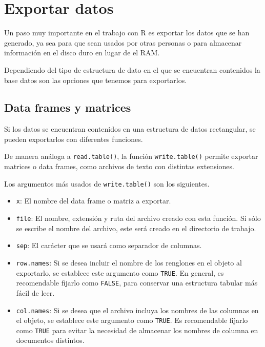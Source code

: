 \documentclass[
]{book}
\providecommand{\tightlist}{%
  \setlength{\itemsep}{0pt}\setlength{\parskip}{0pt}}
\begin{document}
\hypertarget{exportar-datos}{%
\section{Exportar datos}\label{exportar-datos}}

Un paso muy importante en el trabajo con R es exportar los datos que se han generado, ya sea para que sean usados por otras personas o para almacenar información en el disco duro en lugar de el RAM.

Dependiendo del tipo de estructura de dato en el que se encuentran contenidos la base datos son las opciones que tenemos para exportarlos.

\hypertarget{data-frames-y-matrices}{%
\subsection{Data frames y matrices}\label{data-frames-y-matrices}}

Si los datos se encuentran contenidos en una estructura de datos rectangular, se pueden exportarlos con diferentes funciones.

De manera análoga a \texttt{read.table()}, la función \texttt{write.table()} permite exportar matrices o data frames, como archivos de texto con distintas extensiones.

Los argumentos más usados de \texttt{write.table()} son los siguientes.

\begin{itemize}
\tightlist
\item
  \texttt{x}: El nombre del data frame o matriz a exportar.\\
\item
  \texttt{file}: El nombre, extensión y ruta del archivo creado con esta función. Si sólo se escribe el nombre del archivo, este será creado en el directorio de trabajo.\\
\item
  \texttt{sep}: El carácter que se usará como separador de columnas.\\
\item
  \texttt{row.names}: Si se desea incluir el nombre de los renglones en el objeto al exportarlo, se establece este argumento como \texttt{TRUE}. En general, es recomendable fijarlo como \texttt{FALSE}, para conservar una estructura tabular más fácil de leer.\\
\item
  \texttt{col.names}: Si se desea que el archivo incluya los nombres de las columnas en el objeto, se establece este argumento como \texttt{TRUE}. Es recomendable fijarlo como \texttt{TRUE} para evitar la necesidad de almacenar los nombres de columna en documentos distintos.
\end{itemize}
\end{document}
